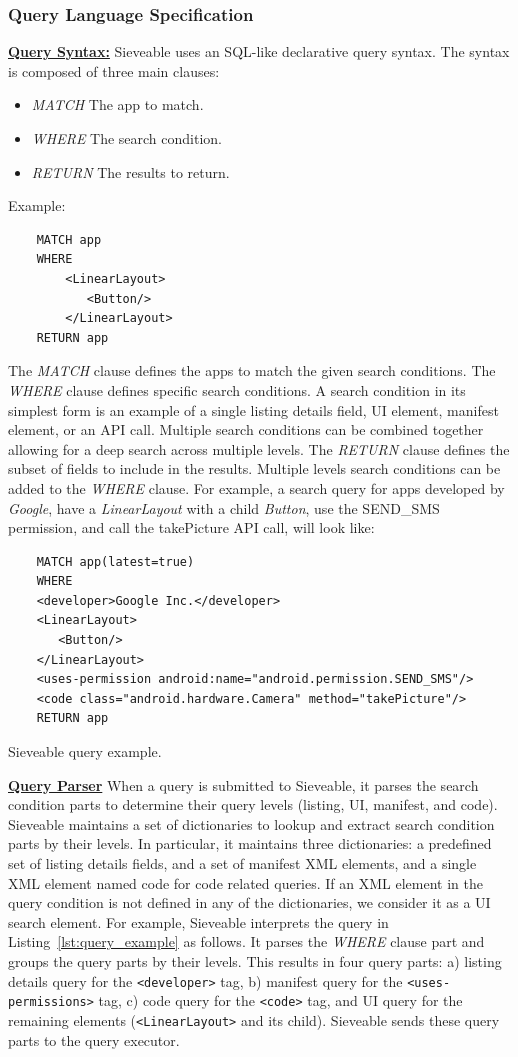 \subsubsection{Query Language Specification}
\underline{\textbf{Query Syntax:}}
Sieveable uses an SQL-like declarative query syntax. The syntax is composed of three main clauses:
\begin{itemize}
	\item \textit{MATCH} The app to match. 
	\item \textit{WHERE} The search condition.
	\item \textit{RETURN} The results to return.
\end{itemize}
Example:
\begin{verbatim}
	MATCH app
	WHERE
	    <LinearLayout>
	       <Button/>
	    </LinearLayout>
	RETURN app
\end{verbatim}
The \textit{MATCH} clause defines the apps to match the given search conditions.
The \textit{WHERE} clause defines specific search conditions. 
A search condition in its simplest form is an example of a single listing details field, UI element, manifest element, or an API call.
Multiple search conditions can be combined together allowing for a deep search across multiple levels.
The \textit{RETURN} clause defines the subset of fields to include in the results.
Multiple levels search conditions can be added to the \textit{WHERE} clause.
For example, a search query for apps developed by \textit{Google}, have a \textit{LinearLayout} with a child \textit{Button}, use the SEND\_SMS permission, and call the takePicture API call, will look like:
\begin{listing}[ht]
	\begin{verbatim}
	MATCH app(latest=true)
	WHERE
	<developer>Google Inc.</developer>
	<LinearLayout>
	   <Button/>
	</LinearLayout>
	<uses-permission android:name="android.permission.SEND_SMS"/>
	<code class="android.hardware.Camera" method="takePicture"/>
	RETURN app
	\end{verbatim}
	\caption{Sieveable query example.}
	\label{lst:query_example}
\end{listing}

\underline{\textbf{Query Parser}}
When a query is submitted to Sieveable, it parses the search condition parts to determine their query levels (listing, UI, manifest, and code).
Sieveable maintains a set of dictionaries to lookup and extract search condition parts by their levels.
In particular, it maintains three dictionaries: a predefined set of listing details fields, and a set of manifest XML elements, and a single XML element named code for code related queries.
If an XML element in the query condition is not defined in any of the dictionaries, we consider it as a UI search element.
For example, Sieveable interprets the query in Listing~\ref{lst:query_example} as follows.
It parses the \textit{WHERE} clause part and groups the query parts by their levels.
This results in four query parts: a) listing details query for the \texttt{<developer>} tag, b) manifest query for the \texttt{<uses-permissions>} tag, c) code query for the \texttt{<code>} tag, and UI query for the remaining elements (\texttt{<LinearLayout>} and its child).
Sieveable sends these query parts to the query executor.

